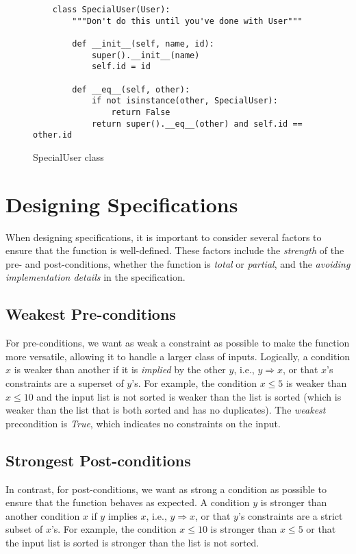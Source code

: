 \documentclass[oneside,11pt,dvipsnames]{book}
\renewcommand{\implies}{\Rightarrow}
\begin{document}
\begin{figure}
\begin{lstlisting}
    class SpecialUser(User):
        """Don't do this until you've done with User"""

        def __init__(self, name, id):
            super().__init__(name)
            self.id = id

        def __eq__(self, other):
            if not isinstance(other, SpecialUser):
                return False
            return super().__eq__(other) and self.id == other.id
\end{lstlisting}
\caption{SpecialUser class}\label{ex:specialuser}
\end{figure}



\section{Designing Specifications}\label{sec:design-specifications}

When designing specifications, it is important to consider several factors to ensure that the function is well-defined. These factors include the \emph{strength} of the pre- and post-conditions, whether the function is \emph{total} or \emph{partial}, and the \emph{avoiding implementation details} in the specification.

\subsection{Weakest Pre-conditions}\label{sec:weakest-preconditions}
For pre-conditions, we want as weak a constraint as possible to make the function more versatile, allowing it to handle a larger class of inputs.
Logically, a condition $x$ is weaker than another if it is \emph{implied} by the other $y$, i.e.,  $y \implies x$, or that $x$'s constraints are a superset of $y$'s. For example, the condition $x \le 5$ is weaker than $x \le 10$ and the input list is not sorted is weaker than the list is sorted (which is weaker than the list that is both sorted and has no duplicates).
The \emph{weakest} precondition is \emph{True}, which indicates no constraints on the input.


\subsection{Strongest Post-conditions}\label{sec:strongest-postconditions}

In contrast, for post-conditions, we want as strong a condition as possible to ensure that the function behaves as expected. A condition $y$ is stronger than another condition $x$ if $y$ implies $x$, i.e., $y \implies x$, or that $y$'s constraints are a strict subset of $x$'s. For example, the condition $x \le 10$ is stronger than $x \le 5$ or that the input list is sorted is stronger than the list is not sorted.
\end{document}
